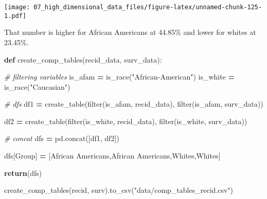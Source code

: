 \documentclass[
]{book}
\newenvironment{Shaded}{\begin{snugshade}}{\end{snugshade}}
\newcommand{\BuiltInTok}[1]{#1}
\newcommand{\CommentTok}[1]{\textcolor[rgb]{0.56,0.35,0.01}{\textit{#1}}}
\newcommand{\ControlFlowTok}[1]{\textcolor[rgb]{0.13,0.29,0.53}{\textbf{#1}}}
\newcommand{\KeywordTok}[1]{\textcolor[rgb]{0.13,0.29,0.53}{\textbf{#1}}}
\newcommand{\NormalTok}[1]{#1}
\newcommand{\OperatorTok}[1]{\textcolor[rgb]{0.81,0.36,0.00}{\textbf{#1}}}
\newcommand{\StringTok}[1]{\textcolor[rgb]{0.31,0.60,0.02}{#1}}
\begin{document}
\texttt{[image: 07\_high\_dimensional\_data\_files/figure-latex/unnamed-chunk-125-1.pdf]}

That number is higher for African Americans at 44.85\% and lower for whites at 23.45\%.

\begin{Shaded}
\begin{Highlighting}[]

\KeywordTok{def}\NormalTok{ create\_comp\_tables(recid\_data, surv\_data):}
  
    \CommentTok{\# filtering variables }
\NormalTok{    is\_afam }\OperatorTok{=}\NormalTok{ is\_race(}\StringTok{"African{-}American"}\NormalTok{)}
\NormalTok{    is\_white }\OperatorTok{=}\NormalTok{ is\_race(}\StringTok{"Caucasian"}\NormalTok{)}
  
    \CommentTok{\# dfs }
\NormalTok{    df1 }\OperatorTok{=}\NormalTok{ create\_table(}\BuiltInTok{filter}\NormalTok{(is\_afam, recid\_data),}
                       \BuiltInTok{filter}\NormalTok{(is\_afam, surv\_data))}
  
\NormalTok{    df2 }\OperatorTok{=}\NormalTok{ create\_table(}\BuiltInTok{filter}\NormalTok{(is\_white, recid\_data), }
                       \BuiltInTok{filter}\NormalTok{(is\_white, surv\_data))}
  
    \CommentTok{\# concat }
\NormalTok{    dfs }\OperatorTok{=}\NormalTok{ pd.concat([df1, df2])}
    
\NormalTok{    dfs[}\StringTok{\textquotesingle{}Group\textquotesingle{}}\NormalTok{] }\OperatorTok{=}\NormalTok{ [}\StringTok{\textquotesingle{}African Americans\textquotesingle{}}\NormalTok{,}\StringTok{\textquotesingle{}African Americans\textquotesingle{}}\NormalTok{,}\StringTok{\textquotesingle{}Whites\textquotesingle{}}\NormalTok{,}\StringTok{\textquotesingle{}Whites\textquotesingle{}}\NormalTok{]}
    
    \ControlFlowTok{return}\NormalTok{(dfs)}
    
\end{Highlighting}
\end{Shaded}

\begin{Shaded}
\begin{Highlighting}[]

\NormalTok{create\_comp\_tables(recid, surv).to\_csv(}\StringTok{"data/comp\_tables\_recid.csv"}\NormalTok{)}
\end{Highlighting}
\end{Shaded}
\end{document}

